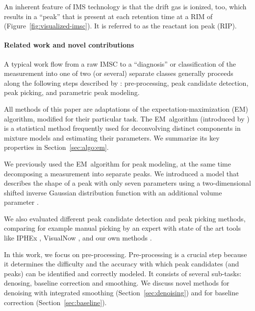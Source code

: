 \documentclass{article}
\begin{document}
An inherent feature of IMS technology is that the drift gas is ionized, too, which results in a ``peak'' that is present at each retention time at a RIM of~ (Figure~\ref{fig:visualized-imsc}). 
It is referred to as the reactant ion peak (RIP).

\paragraph*{Related work and novel contributions}
A typical work flow from a raw IMSC to a ``diagnosis'' or classification of the measurement into one of two (or several) separate classes generally proceeds along the following steps described by \cite{daddario/etal/2014a}:
pre-processing, peak candidate detection, peak picking, and parametric peak modeling.

All methods of this paper are adaptations of the expectation-maximization (EM) algorithm, modified for their particular task.
The EM~algorithm (introduced by \cite{Dempster/etal/1977a}) is a statistical method frequently used for deconvolving distinct components in mixture models and estimating their parameters.
We summarize its key properties in Section~\ref{sec:algo:em}.

We previously used the EM~algorithm for peak modeling, at the same time decomposing a measurement into separate peaks. 
We introduced a model that describes the shape of a peak with only seven parameters using a two-dimensional shifted inverse Gaussian distribution function with an additional volume parameter \citep{Kopczynski/etal/2012a}.

We also evaluated different peak candidate detection and peak picking methods, comparing for example manual picking by an expert with state of the art tools like IPHEx \citep{bunkowski_2011}, VisualNow \citep{bader2007reduction}, and our own methods \citep{hauschild2013eval}.

In this work, we focus on pre-processing.
Pre-processing is a crucial step because it determines the difficulty and the accuracy with which peak candidates (and peaks) can be identified and correctly modeled.
It consists of several sub-tasks: denosing, baseline correction and smoothing.
We discuss novel methods for denoising with integrated smoothing (Section~\ref{sec:denoising}) and for baseline correction (Section~\ref{sec:baseline}).
\end{document}
